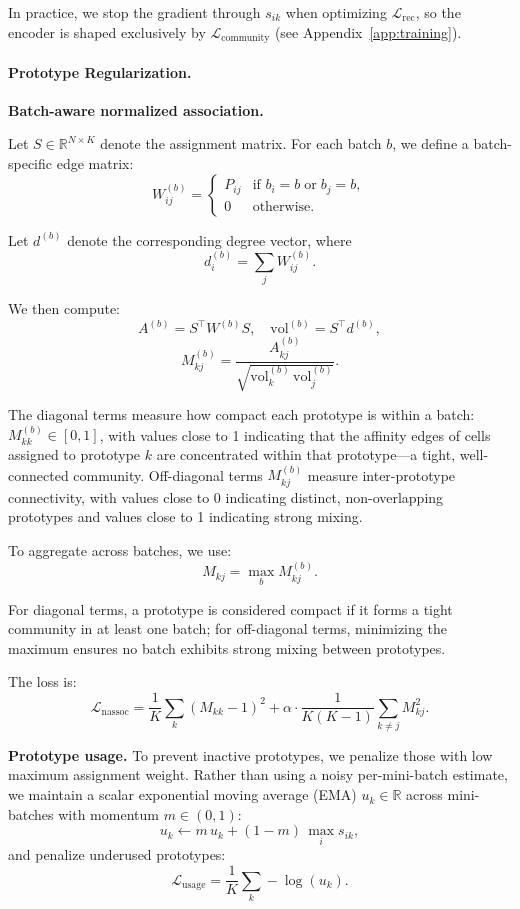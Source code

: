 In practice, we stop the gradient through $s_{ik}$ when optimizing $\mathcal{L}_{\text{rec}}$, so the encoder is shaped exclusively by $\mathcal{L}_{\text{community}}$ (see Appendix~\ref{app:training}).

\paragraph{Prototype Regularization.}

\textbf{Batch-aware normalized association.}

Let $S \in \mathbb{R}^{N \times K}$ denote the assignment matrix.
For each batch $b$, we define a batch-specific edge matrix:
\[
W^{(b)}_{ij} =
\begin{cases}
P_{ij} & \text{if } b_i = b \;\text{or}\; b_j = b, \\0 & \text{otherwise}.
\end{cases}
\]

Let $d^{(b)}$ denote the corresponding degree vector, where
\[
d^{(b)}_i = \sum_j W^{(b)}_{ij}.
\]

We then compute:
\[
A^{(b)} = S^\top W^{(b)} S, \quad
\mathrm{vol}^{(b)} = S^\top d^{(b)},
\]
\[
M^{(b)}_{kj} =
\frac{A^{(b)}_{kj}}
{\sqrt{\mathrm{vol}^{(b)}_k \, \mathrm{vol}^{(b)}_j}}.
\]

The diagonal terms measure how compact each prototype is within a batch: $M^{(b)}_{kk} \in [0,1]$, with values close to 1 indicating that the affinity edges of cells assigned to prototype $k$ are concentrated within that prototype---a tight, well-connected community. Off-diagonal terms $M^{(b)}_{kj}$ measure inter-prototype connectivity, with values close to 0 indicating distinct, non-overlapping prototypes and values close to 1 indicating strong mixing.

To aggregate across batches, we use:
\[
M_{kj} = \max_b M^{(b)}_{kj}.
\]

For diagonal terms, a prototype is considered compact if it forms a tight community in at least one batch; for off-diagonal terms, minimizing the maximum ensures no batch exhibits strong mixing between prototypes.

The loss is:
\[
\mathcal{L}_{\text{nassoc}} =
\frac{1}{K} \sum_k (M_{kk} - 1)^2
+
\alpha \cdot \frac{1}{K(K-1)} \sum_{k \neq j} M_{kj}^2.
\]

\textbf{Prototype usage.}
To prevent inactive prototypes, we penalize those with low maximum assignment weight.
Rather than using a noisy per-mini-batch estimate, we maintain a scalar exponential moving average (EMA) $u_k \in \mathbb{R}$ across mini-batches with momentum $m \in (0,1)$:
\[
u_k \leftarrow m\, u_k + (1-m)\, \max_i s_{ik},
\]
and penalize underused prototypes:
\[
\mathcal{L}_{\text{usage}} = \frac{1}{K} \sum_k -\log(u_k).
\]


